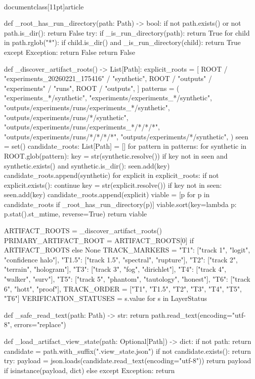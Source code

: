 \\documentclass[11pt]{article}
\begin{document}
\begin{CodeBlock}
def _root_has_run_directory(path: Path) -> bool:
    if not path.exists() or not path.is_dir():
        return False
    try:
        if _is_run_directory(path):
            return True
        for child in path.rglob("*"):
            if child.is_dir() and _is_run_directory(child):
                return True
    except Exception:
        return False
    return False


def _discover_artifact_roots() -> List[Path]:
    explicit_roots = [
        ROOT / "experiments_20260221_175416" / "synthetic",
        ROOT / "outputs" / "experiments" / "runs",
        ROOT / "outputs",
    ]
    patterns = (
        "experiments_*/synthetic",
        "experiments/experiments_*/synthetic",
        "outputs/experiments/runs/experiments_*/synthetic",
        "outputs/experiments/runs/*/synthetic",
        "outputs/experiments/runs/experiments_*/*/*/*",
        "outputs/experiments/runs/*/*/*/*",
        "outputs/experiments/*/synthetic",
    )
    seen = set()
    candidate_roots: List[Path] = []
    for pattern in patterns:
        for synthetic in ROOT.glob(pattern):
            key = str(synthetic.resolve())
            if key not in seen and synthetic.exists() and synthetic.is_dir():
                seen.add(key)
                candidate_roots.append(synthetic)
    for explicit in explicit_roots:
        if not explicit.exists():
            continue
        key = str(explicit.resolve())
        if key not in seen:
            seen.add(key)
            candidate_roots.append(explicit)
    viable = [p for p in candidate_roots if _root_has_run_directory(p)]
    viable.sort(key=lambda p: p.stat().st_mtime, reverse=True)
    return viable


ARTIFACT_ROOTS = _discover_artifact_roots()
PRIMARY_ARTIFACT_ROOT = ARTIFACT_ROOTS[0] if ARTIFACT_ROOTS else None
TRACK_MARKERS = {
    "T1": ["track 1", "logit", "confidence halo"],
    "T1.5": ["track 1.5", "spectral", "rupture"],
    "T2": ["track 2", "terrain", "hologram"],
    "T3": ["track 3", "fog", "dirichlet"],
    "T4": ["track 4", "walker", "surv"],
    "T5": ["track 5", "phantom", "tautology", "honest"],
    "T6": ["track 6", "hott", "proof"],
}
TRACK_ORDER = ["T1", "T1.5", "T2", "T3", "T4", "T5", "T6"]
VERIFICATION_STATUSES = {s.value for s in LayerStatus}


def _safe_read_text(path: Path) -> str:
    return path.read_text(encoding="utf-8", errors="replace")


def _load_artifact_view_state(path: Optional[Path]) -> dict:
    if not path:
        return {}
    candidate = path.with_suffix(".view_state.json")
    if not candidate.exists():
        return {}
    try:
        payload = json.loads(candidate.read_text(encoding="utf-8"))
        return payload if isinstance(payload, dict) else {}
    except Exception:
        return {}



\end{CodeBlock}
\end{document}
